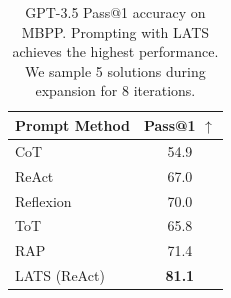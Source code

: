 \begin{table}[t]
    \centering
    \begin{tabular}{l | c}
    \toprule
    \textbf{Prompt Method} & \textbf{Pass@1 $\uparrow$} \\
    \midrule
    CoT {\scriptsize~\citep{wei2022chain}} & 54.9 \\
    ReAct {\scriptsize~\citep{wei2022chain}} & 67.0 \\
    Reflexion {\scriptsize~\citep{shinn2023reflexion}} & 70.0 \\
    ToT {\scriptsize~\citep{yao2023tree}} & 65.8 \\
    RAP {\scriptsize~\citep{hao2023reasoning}} & 71.4 \\
    LATS (ReAct) & \textbf{81.1} \\
    \bottomrule
    \end{tabular}
    \caption{GPT-3.5 Pass@1 accuracy on MBPP. Prompting with LATS achieves the highest performance. We sample 5 solutions during expansion for 8 iterations.}
    \label{table:mbpp}
\end{table}
